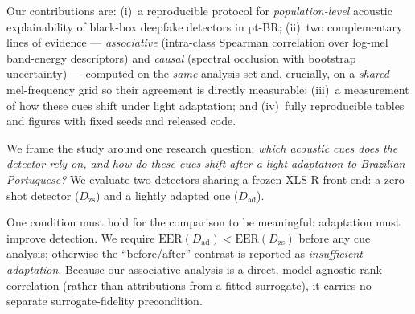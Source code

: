 \documentclass[sigconf]{acmart}
\begin{document}
Our contributions are: (i)~a reproducible protocol for \emph{population-level}
acoustic explainability of black-box deepfake detectors in pt-BR; (ii)~two
complementary lines of evidence --- \emph{associative} (intra-class Spearman
correlation over log-mel band-energy descriptors) and \emph{causal} (spectral
occlusion with bootstrap uncertainty) --- computed on the \emph{same} analysis set
and, crucially, on a \emph{shared} mel-frequency grid so their agreement is
directly measurable; (iii)~a measurement of how these cues shift under light
adaptation; and (iv)~fully reproducible tables and figures with fixed seeds and
released code.

We frame the study around one research question: \emph{which acoustic cues does
the detector rely on, and how do these cues shift after a light adaptation to
Brazilian Portuguese?} We evaluate two detectors sharing a frozen XLS-R
front-end: a zero-shot detector ($D_{\mathrm{zs}}$) and a lightly adapted one
($D_{\mathrm{ad}}$).

One condition must hold for the comparison to be meaningful: adaptation must
improve detection. We require $\mathrm{EER}(D_{\mathrm{ad}}) <
\mathrm{EER}(D_{\mathrm{zs}})$ before any cue analysis; otherwise the
``before/after'' contrast is reported as \emph{insufficient adaptation}. Because
our associative analysis is a direct, model-agnostic rank correlation (rather than
attributions from a fitted surrogate), it carries no separate surrogate-fidelity
precondition.
\end{document}
